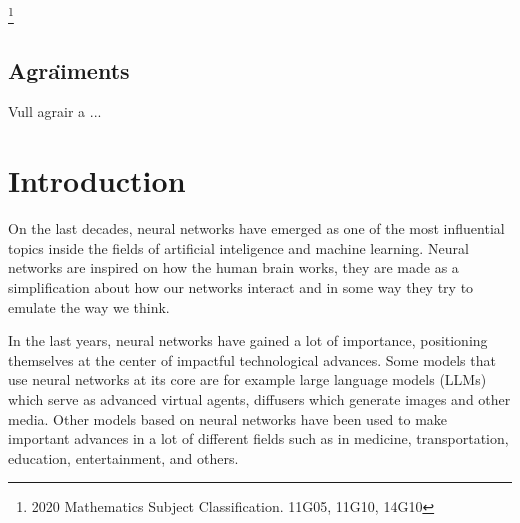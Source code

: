 \documentclass[11pt,a4paper,openright,oneside]{book}
\numberwithin{equation}{section}
\begin{document}
{\let\thefootnote\relax\footnote{2020 Mathematics Subject Classification. 11G05, 11G10, 14G10}}



\newpage 


\section*{Agra\"{\i}ments}

Vull agrair a ... 
\newpage

{\hypersetup{linkcolor=black}
\tableofcontents
}

\newpage

\setcounter{page}{1}
\chapter{Introduction}


On the last decades, neural networks have emerged as one of the most influential topics inside the fields of
artificial inteligence and machine learning. Neural networks are inspired on how the human brain works, they are 
made as a simplification about how our networks interact and in some way they try to emulate the way we think.

In the last years, neural networks have gained a lot of importance, positioning themselves at the center of
impactful technological advances. Some models that use neural networks at its core are
for example large language models (LLMs) which serve as advanced virtual agents, diffusers which
generate images and other media. Other models based on neural networks have been used to make important
advances in a lot of different fields such as in medicine, transportation, education, entertainment, and others.
\end{document}

